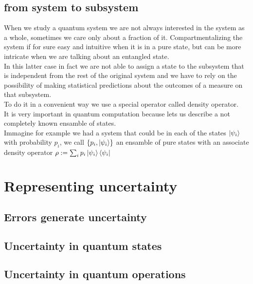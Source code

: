 \documentclass{article}
\begin{document}

\subsection{from system to subsystem}

When we study a quantum system we are not always interested in the
system
as a whole, sometimes we care only about a fraction of it.
Compartmentalizing the system if for sure easy and intuitive when it
is in a pure state, but can be more intricate when we are talking about
an entangled state.\\
In this latter case in fact we are not able to assign a state to the
subsystem that is independent from the rest of the original system
and we have to rely on the possibility of making statistical
predictions
about the outcomes of a measure on that subsystem.\\
To do it in a convenient way we use a special operator called density
operator.\\
It is very important in quantum computation because lets us describe
a not completely known ensamble of states.\\
Immagine for example we had a system that could be in each of the
states
$\ket{\psi_i}$ with probability $p_i$, we call $\{p_i,\ket{\psi_i}\}$ an
ensamble of pure states with an associate density operator
$\rho:=\sum_i p_i \ket{\psi_i}\bra{\psi_i} $



\section{Representing uncertainty}

\subsection{Errors generate uncertainty}

 

\subsection{Uncertainty in quantum states}

\subsection{Uncertainty in quantum operations}
\end{document}
